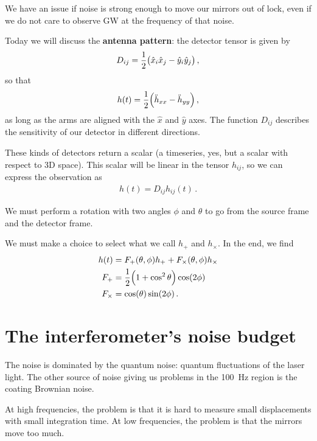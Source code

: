 \documentclass[main.tex]{subfiles}
\begin{document}

We have an issue if noise is strong enough to move our mirrors out of lock, even if we do not care to observe GW at the frequency of that noise.

Today we will discuss the \textbf{antenna pattern}: the detector tensor is given by 
%
\begin{align}
D_{ij} = \frac{1}{2} \qty(\hat{x}_{i} \hat{x}_{j} - \hat{y}_{i} \hat{y}_{j}) 
\,,
\end{align}
%
so that 
%
\begin{align}
h(t) = \frac{1}{2} \qty(\ddot{h}_{xx} - \ddot{h}_{yy})
\,,
\end{align}
%
as long as the arms are aligned with the \(\hat{x}\) and \(\hat{y}\) axes. 
The function \(D_{ij}\) describes the sensitivity of our detector in different directions. 

These kinds of detectors return a scalar (a timeseries, yes, but a scalar with respect to 3D space). This scalar will be linear in the tensor \(h_{ij}\), so we can express the observation as 
%
\begin{align}
h(t) = D_{ij} h_{ij} (t)
\,.
\end{align}

We must perform a rotation with two angles \(\phi \) and \(\theta \) to go from the source frame and the detector frame. 

We must make a choice to select what we call \(h_{+}\) and \(h_{ \times }\). In the end, we find 
%
\begin{align}
h(t) &= F_{+} (\theta , \phi ) h_{+}+ F_{\times} (\theta , \phi ) h_{\times}  \\
F_{+} &= \frac{1}{2} \qty(1 + \cos^2\theta ) \cos( 2 \phi )  \\
F_{ \times } &= \cos(\theta ) \sin(2 \phi )
\,.
\end{align}

\section{The interferometer's noise budget}

The noise is dominated by the quantum noise: quantum fluctuations of the laser light. 
The other source of noise giving us problems in the \SI{100}{Hz} region is the coating Brownian noise. 

At high frequencies, the problem is that it is hard to measure small displacements with small integration time. 
At low frequencies, the problem is that the mirrors move too much. 
\end{document}
